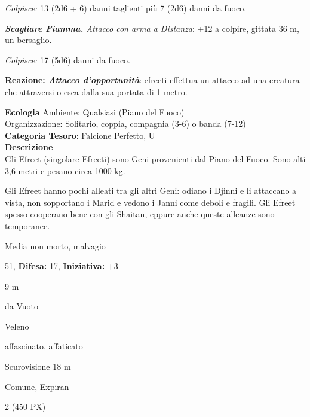 \begin{multicols}{2}
{\emph{Colpisce:} 13 (2d6 + 6) danni taglienti più 7 (2d6) danni da fuoco.

\emph{\textbf{Scagliare Fiamma.} Attacco con arma a Distanza}: +12 a colpire, gittata 36 m, un bersaglio.

\emph{Colpisce:} 17 (5d6) danni da fuoco.

\textbf{Reazione: \emph{Attacco d'opportunità}}: efreeti effettua un attacco ad una creatura che attraversi o esca dalla sua portata di 1 metro.

\textbf{Ecologia}
Ambiente: Qualsiasi (Piano del Fuoco)\\
Organizzazione: Solitario, coppia, compagnia (3-6) o banda (7-12)\\
\textbf{Categoria Tesoro}: Falcione Perfetto, U\\
\textbf{Descrizione}\\
Gli Efreet (singolare Efreeti) sono Geni provenienti dal Piano del Fuoco. Sono alti 3,6 metri e pesano circa 1000 kg.

Gli Efreet hanno pochi alleati tra gli altri Geni: odiano i Djinni e li attaccano a vista, non sopportano i Marid e vedono i Janni come deboli e fragili. Gli Efreet spesso cooperano bene con gli Shaitan, eppure anche queste alleanze sono temporanee.

\noindent
\begin{description}[noitemsep, topsep=0pt, parsep=0pt, partopsep=0pt, leftmargin=0cm, labelwidth=2.2cm]
	\item[\textbf{Taglia/Tipo:}] Media non morto, malvagio
	\item[\textbf{Caratt.:}] 
	\item[\textbf{Punti Ferita:}] 51,  \textbf{Difesa:} 17,  \textbf{Iniziativa:} +3
	\item[\textbf{Movimento:}] 9 m
	\item[\textbf{Tiri Salvez.:}] 
	\item[\textbf{Res. Danni:}] da Vuoto
	\item[\textbf{Imm. Danni:}] Veleno
	\item[\textbf{Immunità:}] affascinato, affaticato
	\item[\textbf{Sensi:}] Scurovisione 18 m
	\item[\textbf{Linguaggi:}] Comune, Expiran
	\item[\textbf{Sfida:}] 2 (450 PX)\smallskip
\end{description}

}
\end{multicols}
